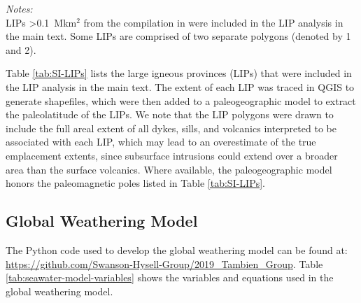 \begin{table}
	\flushleft \emph{Notes:} \\
    LIPs \textgreater0.1~Mkm$^{2}$ from the compilation in \citep{Ernst2008a} were included in the LIP analysis in the main text. Some LIPs are comprised of two separate polygons (denoted by 1 and 2).
	\label{tab:SI-LIPs}
\end{table}

Table \ref{tab:SI-LIPs} lists the large igneous provinces (LIPs) that were included in the LIP analysis in the main text. The extent of each LIP was traced in QGIS to generate shapefiles, which were then added to a paleogeographic model \citep{Swanson-Hysell2019a} to extract the paleolatitude of the LIPs. We note that the LIP polygons were drawn to include the full areal extent of all dykes, sills, and volcanics interpreted to be associated with each LIP, which may lead to an overestimate of the true emplacement extents, since subsurface intrusions could extend over a broader area than the surface volcanics. Where available, the paleogeographic model honors the paleomagnetic poles listed in Table \ref{tab:SI-LIPs}.

\subsection{Global Weathering Model}

The Python code used to develop the global weathering model can be found at: \url{https://github.com/Swanson-Hysell-Group/2019_Tambien_Group}. Table \ref{tab:seawater-model-variables} shows the variables and equations used in the global weathering model.

